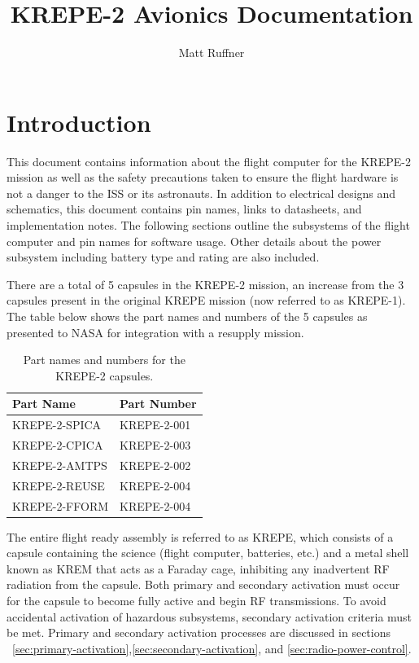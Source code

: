 \documentclass{article}
\title{KREPE-2 Avionics Documentation}
\author{Matt Ruffner}
\date{}
\begin{document}
\maketitle
\tableofcontents
\listoffigures
\listoftables
\newpage


\section{Introduction}

This document contains information about the flight computer for the KREPE-2 mission as well as the safety precautions taken to ensure the flight hardware is not a danger to the ISS or its astronauts. In addition to electrical designs and schematics, this document contains pin names, links to datasheets, and implementation notes. The following sections outline the subsystems of the flight computer and pin names for software usage. Other details about the power subsystem including battery type and rating are also included. 

There are a total of 5 capsules in the KREPE-2 mission, an increase from the 3 capsules present in the original KREPE mission (now referred to as KREPE-1). The table below shows the part names and numbers of the 5 capsules as presented to NASA for integration with a resupply mission.

\begin{table}[H]
\centering
\caption{Part names and numbers for the KREPE-2 capsules.}
\label{tab:partnames}
\begin{tabular}{l | l}
Part Name & Part Number \\
\hline
KREPE-2-SPICA & KREPE-2-001 \\
KREPE-2-CPICA & KREPE-2-003 \\
KREPE-2-AMTPS & KREPE-2-002 \\
KREPE-2-REUSE & KREPE-2-004 \\
KREPE-2-FFORM & KREPE-2-004 \\
\end{tabular}
\end{table}

The entire flight ready assembly is referred to as KREPE, which consists of a capsule containing the science (flight computer, batteries, etc.) and a metal shell known as KREM that acts as a Faraday cage, inhibiting any inadvertent RF radiation from the capsule. Both primary and secondary activation must occur for the capsule to become fully active and begin RF transmissions. To avoid accidental activation of hazardous subsystems, secondary activation criteria must be met. Primary and secondary activation processes are discussed in sections ~\ref{sec:primary-activation},\ref{sec:secondary-activation}, and \ref{sec:radio-power-control}.
\end{document}
